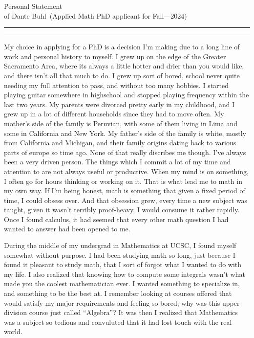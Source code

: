 \documentclass{article}
\newcommand{\soptitle}{Personal Statement}
\newcommand{\yourname}{Dante Buhl}
\begin{document}
\begin{center}\LARGE\soptitle\\
\large of \yourname\ (Applied Math PhD applicant for Fall---2024)
\end{center}

\hrule
\vspace{1pt}
\hrule height 1pt

\bigskip

My choice in applying for a PhD is a decision I'm making due to a long line of work and personal history to myself. I grew up on the edge of the Greater Sacramento Area, where its always a little hotter and drier than you would like, and there isn't all that much to do. I grew up sort of bored, school never quite needing my full attention to pass, and without too many hobbies. I started playing guitar somewhere in highschool and stopped playing frequency within the last two years. My parents were divorced pretty early in my childhood, and I grew up in a lot of different households since they had to move often. My mother's side of the family is Peruvian, with some of them living in Lima and some in California and New York. My father's side of the family is white, mostly from California and Michigan, and their family origins dating back to various parts of europe so time ago. None of that really discribes me though. I've always been a very driven person. The things which I commit a lot of my time and attention to are not always useful or productive. When my mind is on something, I often go for hours thinking or working on it. That is what lead me to math in my own way. If I'm being honest, math is something that given a fixed period of time, I could obsess over. And that obsession grew, every time a new subject was taught, given it wasn't terribly proof-heavy, I would consume it rather rapidly. Once I found calculus, it had seemed that every other math question I had wanted to answer had been opened to me.

During the middle of my undergrad in Mathematics at UCSC, I found myself somewhat without purpose. I had been studying math so long, just because I found it pleasant to study math, that I sort of forgot what I wanted to do with my life. I also realized that knowing how to compute some integrals wasn't what made you the coolest mathematician ever. I wanted something to specialize in, and something to be the best at. I remember looking at courses offered that would satisfy my major requirements and feeling so bored; why was this upper-division course just called ``Algebra''? It was then I realized that Mathematics was a subject so tedious and convuluted that it had lost touch with the real world. 
\end{document}
